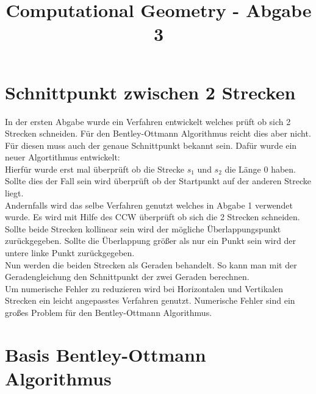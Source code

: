 \documentclass[conference]{IEEEtran}
\begin{document}
	
	\title{Computational Geometry - Abgabe 3}
	
	\author{
	}
	
	\maketitle
	


	\section{Schnittpunkt zwischen 2 Strecken }
	In der ersten Abgabe wurde ein Verfahren entwickelt welches prüft ob sich 2 Strecken schneiden. Für den Bentley-Ottmann Algorithmus reicht dies aber nicht. Für diesen muss auch der genaue Schnittpunkt bekannt sein.
	Dafür wurde ein neuer Algortithmus entwickelt:\\
	Hierfür wurde erst mal überprüft ob die Strecke $s_1$ und $s_2$ die Länge 0 haben. Sollte dies der Fall sein wird überprüft ob der Startpunkt auf der anderen Strecke liegt.\\
	Andernfalls wird das selbe Verfahren genutzt welches in Abgabe 1 verwendet wurde. Es wird mit Hilfe des CCW überprüft ob sich die 2 Strecken schneiden.\\
	Sollte beide Strecken kollinear sein wird der mögliche Überlappungspunkt zurückgegeben. Sollte die Überlappung größer als nur ein Punkt sein wird der untere linke Punkt zurückgegeben.\\
	Nun werden die beiden Strecken als Geraden behandelt. So kann man mit der Geradengleichung den Schnittpunkt der zwei Geraden berechnen.\\
	\[\]
	Um numerische Fehler zu reduzieren wird bei Horizontalen und Vertikalen Strecken ein leicht angepasstes Verfahren genutzt. Numerische Fehler sind ein großes Problem für den Bentley-Ottmann Algorithmus.

	\section{Basis Bentley-Ottmann Algorithmus}
	
\end{document}
